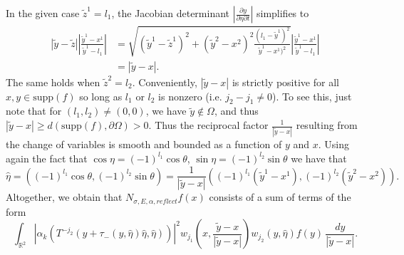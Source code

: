 \documentclass[10pt]{amsart}
\theoremstyle{definition}
\theoremstyle{definition}
\theoremstyle{definition}
\newcommand{ \rn }[1]{\mathbb{R}^{#1}}
\begin{document}
In the given case $\widetilde{z}^{1} = l_{1}$, the Jacobian determinant $\left| \frac{\partial y}{\partial \eta \partial t} \right|$ simplifies to
\begin{align*}
 |\widetilde{y}-\widetilde{z}|\left| \frac{\widetilde{y}^{1}-x^{1}}{\widetilde{y}^{1} - l_{1}} \right| & = \sqrt{ (\widetilde{y}^{1} - \widetilde{z}^{1})^{2} + (\widetilde{y}^{2} - x^{2})^{2} \frac{(l_{1} - \widetilde{y}^{1})^{2}}{\widetilde{y}^{1} - x^{1})^{2}}} \left| \frac{\widetilde{y}^{1}-x^{1}}{\widetilde{y}^{1} - l_{1}} \right| \\
 & = |\widetilde{y} - x|.
 \end{align*}
The same holds when $\widetilde{z}^{2} = l_{2}$. Conveniently, $|\widetilde{y}-x|$ is strictly positive for all $x,y \in \mathrm{supp}(f)$ so long as $l_{1}$ or $l_{2}$ is nonzero (i.e. $j_{2} - j_{1} \neq 0$). To see this, just note that for $(l_{1},l_{2}) \neq (0,0)$, we have $\widetilde{y} \notin \Omega$, and thus $|\widetilde{y} - x| \geq d(\mathrm{supp}(f), \partial \Omega) > 0$. Thus the reciprocal factor $\frac{1}{|\widetilde{y}-x|}$ resulting from the change of variables is smooth and bounded as a function of $y$ and $x$. Using again the fact that $\cos{\eta} = (-1)^{l_{1}}\cos{\theta}$, $\sin{\eta} = (-1)^{l_{2}}\sin{\theta}$ we have that
\begin{equation*}
\widehat{\eta} = ((-1)^{l_{1}}\cos{\theta},(-1)^{l_{2}}\sin{\theta}) = \frac{1}{|\widetilde{y}-x|}( (-1)^{l_{1}}(\widetilde{y}^{1}- x^{1}), (-1)^{l_{2}}(\widetilde{y}^{2} - x^{2})).
\end{equation*}
Altogether, we obtain that $N_{\sigma, E,\alpha, reflect}f(x)$ consists of a sum of terms of the form
\begin{equation}
\int_{\rn{2}} |\alpha_{k}(T^{-j_{2}}(y + \tau_{-}(y,\widehat{\eta})\widehat{\eta}, \widehat{\eta}))|^{2} w_{j_{1}}\left( x,\frac{\widetilde{y}-x}{|\widetilde{y}-x|} \right) w_{j_{2}}\left(y, \widehat{\eta}\right)f\left(y\right)\, \frac{dy}{|\widetilde{y} -x|}.\label{eq:normalreflectedterm}
\end{equation}
\end{document}
